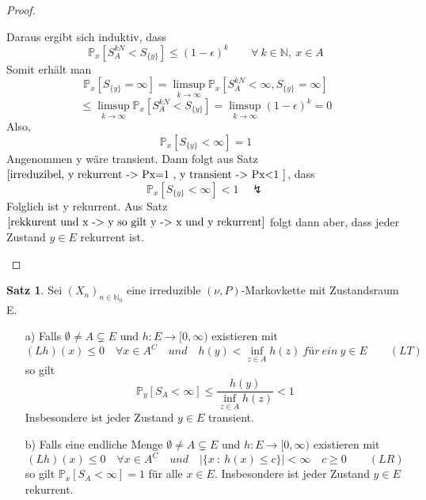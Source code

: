 \documentclass[a4paper,12pt]{scrartcl}
\theoremstyle{definition}
\newtheorem{sat}{Satz}[section]
\begin{document}
\begin{proof}
\begin{itemize}
\begin{equation*}
\end{equation*}
Daraus ergibt sich induktiv, dass
\begin{equation*}
\mathbb{P}_{x}[S_{A}^{kN} < S_{\lbrace y \rbrace}] \leq (1- \epsilon)^{k} \qquad \forall \: k \in \mathbb{N}, \: x \in A
\end{equation*}
Somit erhält man 
\begin{equation*}
\mathbb{P}_{x}[S_{\lbrace y \rbrace} = \infty] = \limsup_{k \to \infty} \mathbb{P}_{x}[S_{A}^{kN} < \infty, S_{\lbrace y \rbrace} = \infty]
\end{equation*}
\begin{equation*}
\leq \limsup_{k \to \infty} \mathbb{P}_{x}[S_{A}^{kN} < S_{\lbrace y \rbrace}] = \limsup_{k \to \infty} (1 - \epsilon)^{k} = 0
\end{equation*}
Also,
\begin{equation*}
\mathbb{P}_{x}[S_{\lbrace y \rbrace} < \infty] = 1
\end{equation*}
Angenommen y wäre transient. Dann folgt aus Satz $\ref{irreduzibel, y rekurrent -> Px=1 , y transient -> Px<1 }$, dass
\begin{equation*}
\mathbb{P}_{x}[S_{\lbrace y \rbrace} < \infty] < 1 \quad \lightning
\end{equation*}
Folglich ist y rekurrent. Aus Satz $\ref{rekkurent und x -> y so gilt y -> x und y rekurrent}$ folgt dann aber, dass jeder Zustand $y \in E$ rekurrent ist.
\end{itemize}
\end{proof}
\begin{sat}
\label{Folgerung Dynkin Formel, (LR), (LT)}
Sei $(X_{n})_{n \in \mathbb{N}_{0}}$ eine irreduzible $(\nu,P)$-Markovkette mit Zustandsraum E.
\begin{itemize}
\item[a)] Falls $\emptyset \neq A \subsetneq E$ und $h: E \to [0, \infty)$ existieren mit
\begin{equation*}
(Lh)(x) \leq 0 \quad \forall x \in A^{C} \quad und \quad h(y) < \inf_{z \in A} h(z) \: für \: ein \: y \in E \qquad (LT)
\end{equation*} 
so gilt
\begin{equation*}
\mathbb{P}_{y}[S_{A} < \infty] \leq \dfrac{h(y)}{\inf_{z \in A} h(z)} < 1
\end{equation*}
Insbesondere ist jeder Zustand $y \in E$ transient.
\item[b)] Falls eine endliche Menge $\emptyset \neq A \subsetneq E$ und $h: E \to [0, \infty)$ existieren mit
\begin{equation*}
(Lh)(x) \leq 0 \quad \forall x \in A^{C} \quad und \quad \vert \lbrace x \: : \: h(x) \leq c \rbrace \vert < \infty \quad c \geq 0 \qquad (LR)
\end{equation*}
so gilt $\mathbb{P}_{x}[S_{A}< \infty] = 1$ für alle $x \in E$. Insbesondere ist jeder Zustand $y \in E$ rekurrent.
\end{itemize}
\end{sat}
\end{document}
